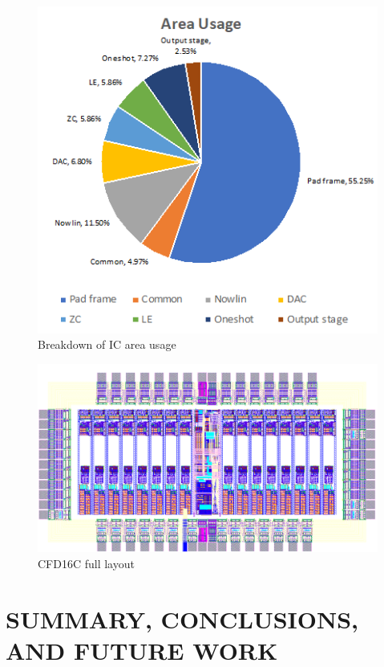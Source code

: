 \documentclass[12pt,oneside,final]{siuethesis}
\theoremstyle{definition}
\begin{document}
\begin{figure}[htbp!]
 \centering
 \includegraphics[scale=1.2]{./ch4_figures/area_usage.png}
 \caption{Breakdown of IC area usage}
 \label{fig:area}
\end{figure} 

\begin{figure}[htbp!]
 \centering
 \includegraphics[scale=.6,angle=90]{./ch4_figures/cfd_chip.png}
 \caption{CFD16C full layout}
 \label{fig:layout}
\end{figure} 


\chapter{SUMMARY, CONCLUSIONS, AND FUTURE WORK}
\end{document}
